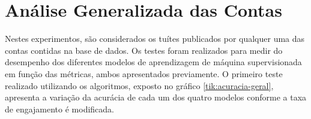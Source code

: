 \documentclass[oneside,openright,12pt]{ufsm_2015} %
\begin{document}

\section{Análise Generalizada das Contas}
\label{sec:exp-geral}
    
    \par Nestes experimentos, são considerados os tuítes publicados por qualquer uma das contas contidas na base de dados. Os testes foram realizados para medir do desempenho dos diferentes modelos de aprendizagem de máquina supervisionada em função das métricas, ambos apresentados previamente. O primeiro teste realizado utilizando os algoritmos, exposto no gráfico \ref{tik:acuracia-geral}, apresenta a variação da acurácia de cada um dos quatro modelos conforme a taxa de engajamento é modificada.
    
    \mydata
    
\end{document}
